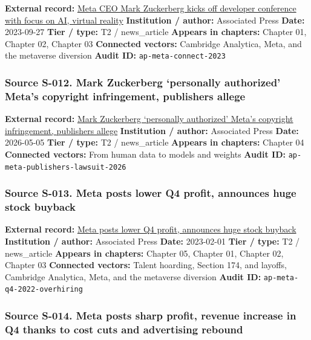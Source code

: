 \documentclass[
  american,
  11pt,
  letterpaper,
]{article}
\begin{document}
\textbf{External record:}
\href{https://apnews.com/article/b76de22d14efc9b9713a412caf150103}{Meta
CEO Mark Zuckerberg kicks off developer conference with focus on AI,
virtual reality} \textbf{Institution / author:} Associated Press
\textbf{Date:} 2023-09-27 \textbf{Tier / type:} T2 / news\_article
\textbf{Appears in chapters:} Chapter 01, Chapter 02, Chapter 03
\textbf{Connected vectors:} Cambridge Analytica, Meta, and the metaverse
diversion \textbf{Audit ID:} \texttt{ap-meta-connect-2023}

\subsubsection{Source S-012. Mark Zuckerberg `personally authorized'
Meta's copyright infringement, publishers
allege}\label{source-s-012-mark-zuckerberg-personally-authorized-meta-s-copyright-infringement-publishers-allege}

\textbf{External record:}
\href{https://apnews.com/article/5609846d4d840014974a847b01079c32}{Mark
Zuckerberg `personally authorized' Meta's copyright infringement,
publishers allege} \textbf{Institution / author:} Associated Press
\textbf{Date:} 2026-05-05 \textbf{Tier / type:} T2 / news\_article
\textbf{Appears in chapters:} Chapter 04 \textbf{Connected vectors:}
From human data to models and weights \textbf{Audit ID:}
\texttt{ap-meta-publishers-lawsuit-2026}

\subsubsection{Source S-013. Meta posts lower Q4 profit, announces huge
stock
buyback}\label{source-s-013-meta-posts-lower-q4-profit-announces-huge-stock-buyback}

\textbf{External record:}
\href{https://apnews.com/article/b884c9ac96be1c22f81d7243176a321d}{Meta
posts lower Q4 profit, announces huge stock buyback} \textbf{Institution
/ author:} Associated Press \textbf{Date:} 2023-02-01 \textbf{Tier /
type:} T2 / news\_article \textbf{Appears in chapters:} Chapter 05,
Chapter 01, Chapter 02, Chapter 03 \textbf{Connected vectors:} Talent
hoarding, Section 174, and layoffs, Cambridge Analytica, Meta, and the
metaverse diversion \textbf{Audit ID:}
\texttt{ap-meta-q4-2022-overhiring}

\subsubsection{Source S-014. Meta posts sharp profit, revenue increase
in Q4 thanks to cost cuts and advertising
rebound}\label{source-s-014-meta-posts-sharp-profit-revenue-increase-in-q4-thanks-to-cost-cuts-and-advertising-rebound}
\end{document}
